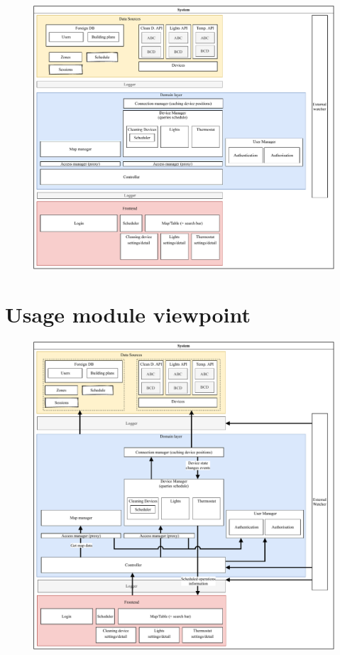 \documentclass{article}
\begin{document}
\begin{figure}[h]
\includegraphics[width=.9\textwidth]{decomposition.pdf}
\centering
\end{figure}

\newpage
\section*{Usage module viewpoint}

\begin{figure}[h]
\includegraphics[width=.9\textwidth]{Usage.pdf}
\centering
\end{figure}
\end{document}
